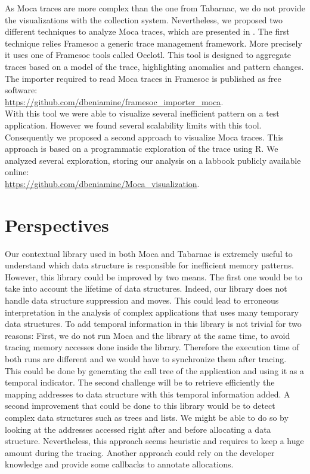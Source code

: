 As \gls{Moca} traces are more complex than the one from \gls{Tabarnac}, we do not provide the visualizations with the collection system.
Nevertheless, we proposed two different techniques to analyze \gls{Moca} traces, which are presented in .
The first technique relies \gls{Framesoc} a generic trace management framework.
More precisely it uses one of \gls{Framesoc} tools called \gls{Ocelotl}.
This tool is designed to aggregate traces based on a model of the trace, highlighting anomalies and pattern changes.
The importer required to read \gls{Moca} traces in \gls{Framesoc} is published as free software:\\
\url{https://github.com/dbeniamine/framesoc\_importer\_moca}.\\
With this tool we were able to visualize several inefficient pattern on a test application.
However we found several scalability limits with this tool.
Consequently we proposed a second approach to visualize \gls{Moca} traces.
This approach is based on a programmatic exploration of the trace using \gls{R}.
We analyzed several exploration, storing our analysis on a labbook publicly available online:\\
\url{https://github.com/dbeniamine/Moca_visualization}.

\section{Perspectives}

Our contextual library used in both \gls{Moca} and \gls{Tabarnac} is extremely useful to understand which data structure is responsible for inefficient memory patterns.
However, this library could be improved by two means.
The first one would be to take into account the lifetime of data structures.
Indeed, our library does not handle data structure suppression and moves.
This could lead to erroneous interpretation in the analysis of complex applications that uses many temporary data structures.
To add temporal information in this library is not trivial for two reasons:
First, we do not run \gls{Moca} and the library at the same time, to avoid tracing memory accesses done inside the library.
Therefore the execution time of both runs are different and we would have to synchronize them after tracing.
This could be done by generating the call tree of the application and using it as a temporal indicator.
The second challenge will be to retrieve efficiently the mapping addresses to data structure with this temporal information added.
A second improvement that could be done to this library would be to detect complex data structures such as trees and lists.
We might be able to do so by looking at the addresses accessed right after and before allocating a data structure.
Nevertheless, this approach seems heuristic and requires to keep a huge amount during the tracing.
Another approach could rely on the developer knowledge and provide some callbacks to annotate allocations.

